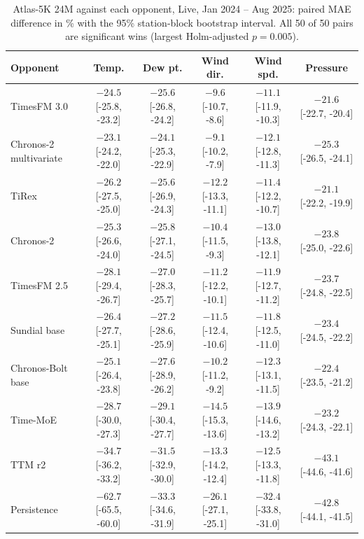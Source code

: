 \begin{table}[H]
\centering\scriptsize
\setlength{\tabcolsep}{2.4pt}
\caption{Atlas-5K 24M against each opponent, Live, Jan 2024 -- Aug 2025: paired MAE difference in \% with the 95\% station-block bootstrap interval. All 50 of 50 pairs are significant wins (largest Holm-adjusted $p=0.005$).}
\label{tab:paired_atlas25m_live}
\begin{tabular}{lccccc}
\toprule
Opponent & Temp. & Dew pt. & Wind dir. & Wind spd. & Pressure\\
\midrule
TimesFM 3.0 & $-24.5$ [-25.8, -23.2] & $-25.6$ [-26.8, -24.2] & $-9.6$ [-10.7, -8.6] & $-11.1$ [-11.9, -10.3] & $-21.6$ [-22.7, -20.4]\\
Chronos-2 multivariate & $-23.1$ [-24.2, -22.0] & $-24.1$ [-25.3, -22.9] & $-9.1$ [-10.2, -7.9] & $-12.1$ [-12.8, -11.3] & $-25.3$ [-26.5, -24.1]\\
TiRex & $-26.2$ [-27.5, -25.0] & $-25.6$ [-26.9, -24.3] & $-12.2$ [-13.3, -11.1] & $-11.4$ [-12.2, -10.7] & $-21.1$ [-22.2, -19.9]\\
Chronos-2 & $-25.3$ [-26.6, -24.0] & $-25.8$ [-27.1, -24.5] & $-10.4$ [-11.5, -9.3] & $-13.0$ [-13.8, -12.1] & $-23.8$ [-25.0, -22.6]\\
TimesFM 2.5 & $-28.1$ [-29.4, -26.7] & $-27.0$ [-28.3, -25.7] & $-11.2$ [-12.2, -10.1] & $-11.9$ [-12.7, -11.2] & $-23.7$ [-24.8, -22.5]\\
Sundial base & $-26.4$ [-27.7, -25.1] & $-27.2$ [-28.6, -25.9] & $-11.5$ [-12.4, -10.6] & $-11.8$ [-12.5, -11.0] & $-23.4$ [-24.5, -22.2]\\
Chronos-Bolt base & $-25.1$ [-26.4, -23.8] & $-27.6$ [-28.9, -26.2] & $-10.2$ [-11.2, -9.2] & $-12.3$ [-13.1, -11.5] & $-22.4$ [-23.5, -21.2]\\
Time-MoE & $-28.7$ [-30.0, -27.3] & $-29.1$ [-30.4, -27.7] & $-14.5$ [-15.3, -13.6] & $-13.9$ [-14.6, -13.2] & $-23.2$ [-24.3, -22.1]\\
TTM r2 & $-34.7$ [-36.2, -33.2] & $-31.5$ [-32.9, -30.0] & $-13.3$ [-14.2, -12.4] & $-12.5$ [-13.3, -11.8] & $-43.1$ [-44.6, -41.6]\\
Persistence & $-62.7$ [-65.5, -60.0] & $-33.3$ [-34.6, -31.9] & $-26.1$ [-27.1, -25.1] & $-32.4$ [-33.8, -31.0] & $-42.8$ [-44.1, -41.5]\\
\bottomrule
\end{tabular}
\end{table}
